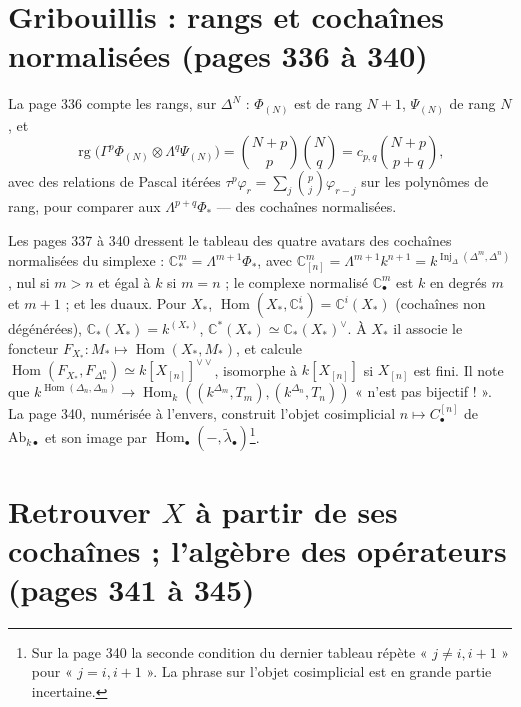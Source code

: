 \documentclass[11pt,a4paper]{article}
\begin{document}
\section*{Gribouillis : rangs et cochaînes normalisées (pages 336 à 340)}

La page 336 compte les rangs, sur $\Delta^N$ : $\Phi_{(N)}$ est de rang $N+1$,
$\Psi_{(N)}$ de rang $N$, et
\[
\operatorname{rg}\bigl(\Gamma^p\Phi_{(N)} \otimes \Lambda^q\Psi_{(N)}\bigr) = \binom{N+p}{p}\binom{N}{q} = c_{p,q}\binom{N+p}{p+q} ,
\]
avec des relations de Pascal itérées $\tau^p\varphi_r = \sum_j \binom{p}{j}
\varphi_{r-j}$ sur les polynômes de rang, pour comparer aux $\Lambda^{p+q}\Phi_*$
— des cochaînes normalisées.

Les pages 337 à 340 dressent le tableau des quatre avatars des cochaînes
normalisées du simplexe : $\mathbb{C}^m_* = \Lambda^{m+1}\Phi_*$, avec
$\mathbb{C}^m_{[n]} = \Lambda^{m+1}k^{n+1} = k^{\operatorname{Inj}_\Delta(\Delta^m,
\Delta^n)}$, nul si $m > n$ et égal à $k$ si $m = n$ ; le complexe normalisé
$\mathbb{C}^m_\bullet$ est $k$ en degrés $m$ et $m+1$ ; et les duaux. Pour
$X_*$, $\operatorname{Hom}(X_*, \mathbb{C}^i_*) = \mathbb{C}^i(X_*)$ (cochaînes
non dégénérées), $\mathbb{C}_*(X_*) = k^{(X_*)}$, $\mathbb{C}^*(X_*) \simeq
\mathbb{C}_*(X_*)^\vee$. À $X_*$ il associe le foncteur $F_{X_*} : M_* \mapsto
\operatorname{Hom}(X_*, M_*)$, et calcule $\operatorname{Hom}(F_{X_*},
F_{\Delta^n_*}) \simeq k[X_{[n]}]^{\vee\vee}$, isomorphe à $k[X_{[n]}]$ si
$X_{[n]}$ est fini. Il note que $k^{\operatorname{Hom}(\Delta_n, \Delta_m)} \to
\operatorname{Hom}_k((k^{\Delta_m}, T_m), (k^{\Delta_n}, T_n))$ « n'est pas
bijectif ! ». La page 340, numérisée à l'envers, construit l'objet cosimplicial
$n \mapsto C^{[n]}_\bullet$ de $\mathrm{Ab}_{k\bullet}$ et son image par
$\operatorname{Hom}_\bullet(-, \tilde{\lambda}_\bullet)$\footnote{Sur la page
340 la seconde condition du dernier tableau répète « $j \neq i, i+1$ » pour
« $j = i, i+1$ ». La phrase sur l'objet cosimplicial est en grande partie
incertaine.}.

\section*{Retrouver $X$ à partir de ses cochaînes ; l'algèbre des opérateurs (pages 341 à 345)}
\end{document}

